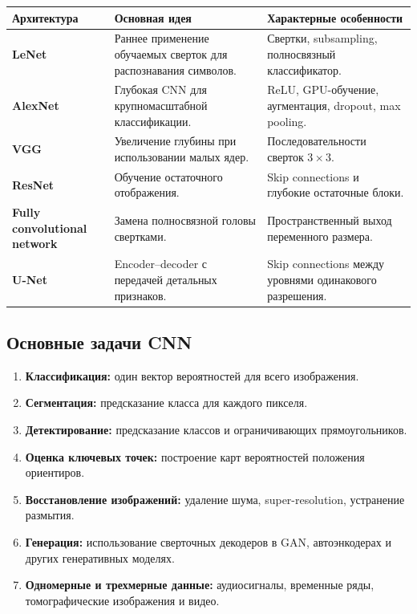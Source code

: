 \documentclass[12pt,a4paper]{article}
\numberwithin{equation}{section}
\theoremstyle{definition}
\theoremstyle{remark}
\begin{document}
\begin{center}
\begin{tabularx}{\textwidth}{
    >{\bfseries}p{2.5cm}
    X
    X
}
\toprule
Архитектура & Основная идея & Характерные особенности\\
\midrule
LeNet
&
Раннее применение обучаемых сверток для распознавания символов.
&
Свертки, subsampling, полносвязный классификатор.\\

AlexNet
&
Глубокая CNN для крупномасштабной классификации.
&
ReLU, GPU-обучение, аугментация, dropout, max pooling.\\

VGG
&
Увеличение глубины при использовании малых ядер.
&
Последовательности сверток \(3\times3\).\\

ResNet
&
Обучение остаточного отображения.
&
Skip connections и глубокие остаточные блоки.\\

Fully convolutional network
&
Замена полносвязной головы свертками.
&
Пространственный выход переменного размера.\\

U-Net
&
Encoder--decoder с передачей детальных признаков.
&
Skip connections между уровнями одинакового разрешения.\\
\bottomrule
\end{tabularx}
\end{center}

\subsection{Основные задачи CNN}

\begin{enumerate}
    \item \textbf{Классификация:}
    один вектор вероятностей для всего изображения.

    \item \textbf{Сегментация:}
    предсказание класса для каждого пикселя.

    \item \textbf{Детектирование:}
    предсказание классов и ограничивающих прямоугольников.

    \item \textbf{Оценка ключевых точек:}
    построение карт вероятностей положения ориентиров.

    \item \textbf{Восстановление изображений:}
    удаление шума, super-resolution, устранение размытия.

    \item \textbf{Генерация:}
    использование сверточных декодеров в GAN, автоэнкодерах и других
    генеративных моделях.

    \item \textbf{Одномерные и трехмерные данные:}
    аудиосигналы, временные ряды, томографические изображения и видео.
\end{enumerate}
\end{document}
